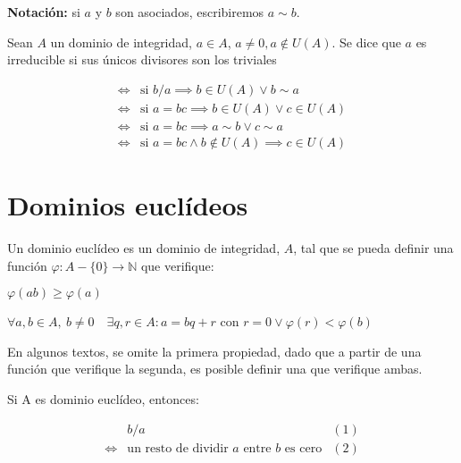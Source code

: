 \textbf{Notación:} si $a$ y $b$ son asociados, escribiremos $a \sim b$.

\begin{ndef}[Irreducible]

	Sean $A$ un dominio de integridad, $a\in A$, $a\neq 0, a \notin U(A)$. Se dice que $a$ es irreducible si sus únicos divisores son los triviales

\begin{align*}
	\iff& \text{si } b/a \implies b\in U(A) \vee b \sim a
\\
	\iff& \text{si } a=bc \implies b\in U(A) \vee c \in U(A)
\\
	\iff& \text{si } a=bc \implies a\sim b \vee c \sim a
\\
	\iff& \text{si } a=bc \wedge b \notin U(A) \implies c \in U(A)
\end{align*}
\end{ndef}


\section{Dominios euclídeos}
\begin{ndef}

	Un dominio euclídeo es un dominio de integridad, $A$, tal que se pueda definir una función $\varphi: A- \{0\} \to \mathbb{N} $ que verifique:

\begin{nlist}
	\item $\varphi(ab) \ge \varphi(a)$
	\item $\forall a,b \in A,\ b \neq 0 \quad \exists q,r \in A : a = bq + r $ con $r=0 \vee \varphi(r) < \varphi(b)$
\end{nlist}
\end{ndef}

\begin{nota}
  En algunos textos, se omite la primera propiedad, dado que a partir de una función que verifique la segunda, es posible definir una que verifique ambas.
\end{nota}


\begin{nprop}
  Si A es dominio euclídeo, entonces:

  \[
  \begin{array}{lll}
    & b/a & (1) \\
    \iff & \text{un resto de dividir $a$ entre $b$ es cero} & (2) \\
  \end{array}
  \]
\end{nprop}

